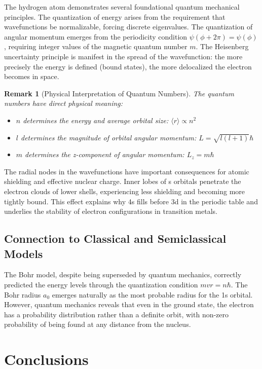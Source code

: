 \documentclass[11pt,a4paper]{article}
\newtheorem{remark}{Remark}[section]
\begin{document}
The hydrogen atom demonstrates several foundational quantum mechanical principles. The quantization of energy arises from the requirement that wavefunctions be normalizable, forcing discrete eigenvalues. The quantization of angular momentum emerges from the periodicity condition $\psi(\phi + 2\pi) = \psi(\phi)$, requiring integer values of the magnetic quantum number $m$. The Heisenberg uncertainty principle is manifest in the spread of the wavefunction: the more precisely the energy is defined (bound states), the more delocalized the electron becomes in space.

\begin{remark}[Physical Interpretation of Quantum Numbers]
The quantum numbers have direct physical meaning:
\begin{itemize}
\item $n$ determines the energy and average orbital size: $\langle r \rangle \propto n^2$
\item $l$ determines the magnitude of orbital angular momentum: $L = \sqrt{l(l+1)}\hbar$
\item $m$ determines the z-component of angular momentum: $L_z = m\hbar$
\end{itemize}
\end{remark}

The radial nodes in the wavefunctions have important consequences for atomic shielding and effective nuclear charge. Inner lobes of s orbitals penetrate the electron clouds of lower shells, experiencing less shielding and becoming more tightly bound. This effect explains why 4s fills before 3d in the periodic table and underlies the stability of electron configurations in transition metals.

\subsection{Connection to Classical and Semiclassical Models}

The Bohr model, despite being superseded by quantum mechanics, correctly predicted the energy levels through the quantization condition $mvr = n\hbar$. The Bohr radius $a_0$ emerges naturally as the most probable radius for the 1s orbital. However, quantum mechanics reveals that even in the ground state, the electron has a probability distribution rather than a definite orbit, with non-zero probability of being found at any distance from the nucleus.

\section{Conclusions}
\end{document}
